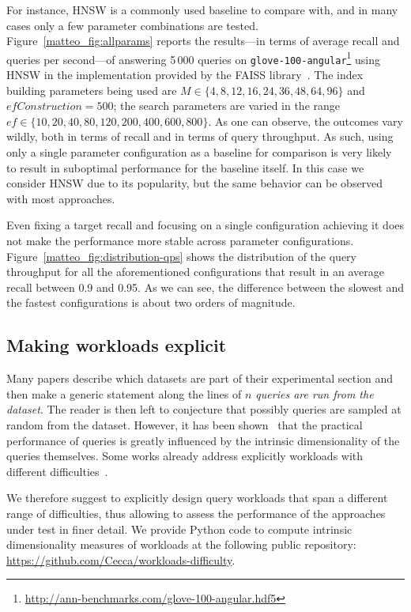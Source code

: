 \documentclass[11pt]{article}
\begin{document}
For instance, HNSW is a commonly used baseline to compare with, and in many
cases only a few parameter combinations are tested.
Figure~\ref{matteo_fig:allparams} reports the results---in terms of average recall
and queries per second---of answering 5\,000 queries on
\texttt{glove-100-angular}\footnote{\url{http://ann-benchmarks.com/glove-100-angular.hdf5}}
using HNSW in the implementation provided by the FAISS library~\cite{DBLP:journals/tbd/JohnsonDJ21}.
The index building parameters being used are
$M \in \{4,8,12,16,24,36,48,64,96\}$ and $efConstruction = 500$; the search parameters are varied in the range
$ef \in \{10, 20, 40, 80, 120, 200, 400, 600, 800\}$.
As one can observe, the outcomes vary wildly, both in terms of recall and
in terms of query throughput. As such, using only a single parameter
configuration as a baseline for comparison is very likely to result in
suboptimal performance for the baseline itself. In this case we consider HNSW
due to its popularity, but the same behavior can be observed with most
approaches.

Even fixing a target recall and focusing on a single configuration
achieving it does not make the performance more stable across parameter
configurations. Figure~\ref{matteo_fig:distribution-qps} shows the distribution of
the query throughput for all the aforementioned configurations that result
in an average recall between 0.9 and 0.95. As we can see, the difference
between the slowest and the fastest configurations is about two orders of
magnitude.

\subsection{Making workloads explicit}

Many papers describe which datasets are part of their experimental section and
then make a generic statement along the lines of \emph{$n$ queries are run from
	the dataset}. The reader is then left to conjecture that possibly queries are
sampled at random from the dataset. However, it has been
shown~\cite{DBLP:journals/is/AumullerC21} that the practical performance of
queries is greatly influenced by the intrinsic dimensionality of the queries
themselves. Some works already address explicitly
workloads with different
difficulties~\cite{DBLP:journals/vldb/ZoumpatianosLIP18,DBLP:journals/pvldb/EchihabiFZPB22}.

We therefore suggest to explicitly design query workloads that span a different
range of difficulties, thus allowing to assess the performance of the
approaches under test in finer detail. We provide Python code to compute
intrinsic dimensionality measures of workloads at the following public
repository: \url{https://github.com/Cecca/workloads-difficulty}.
\end{document}
